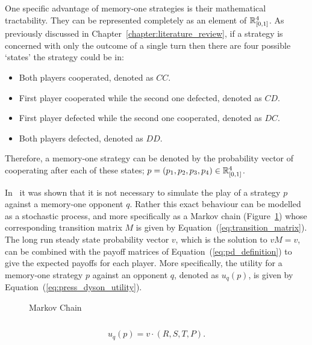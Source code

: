 One specific advantage of memory-one strategies is their mathematical
tractability. They can be represented completely as an element of \(\mathbb{R}^{4}_{[0, 1]}\).
As previously discussed in Chapter~\ref{chapter:literature_review},
if a strategy is concerned with only the outcome of a single turn then there are
four possible `states' the strategy could be in:

\begin{itemize}
    \item Both players cooperated, denoted as \(CC\).
    \item First player cooperated while the second one defected, denoted as \(CD\).
    \item First player defected while the second one cooperated, denoted as \(DC\).
    \item Both players defected, denoted as \(DD\).
\end{itemize}

Therefore, a memory-one strategy can be denoted by the probability vector of
cooperating after each of these states; \(p=(p_1, p_2, p_3, p_4) \in \mathbb{R}_{[0,1]}
^ 4\).

In~\cite{Nowak1989} it was shown that it is not necessary to simulate the play
of a strategy $p$ against a memory-one opponent $q$. Rather this exact behaviour
can be modelled as a stochastic process, and more specifically as a Markov chain
(Figure~\ref{fig:markov_chain}) whose corresponding transition matrix \(M\) is
given by Equation~(\ref{eq:transition_matrix}). The long run steady state probability
vector \(v\), which is the solution to \(v M = v\), can be
combined with the payoff matrices of Equation~(\ref{eq:pd_definition}) to give the expected
payoffs for each player. More specifically, the utility for a memory-one
strategy \(p\) against an opponent \(q\), denoted as \(u_q(p)\), is given by
Equation~(\ref{eq:press_dyson_utility}).

\begin{figure}
    \centering
    
    \caption{Markov Chain}
    \label{fig:markov_chain}
\end{figure}

\begin{equation}\label{eq:transition_matrix}
    
\end{equation}


\begin{equation}\label{eq:press_dyson_utility}
    u_q(p) = v \cdot (R, S, T, P).
\end{equation}

